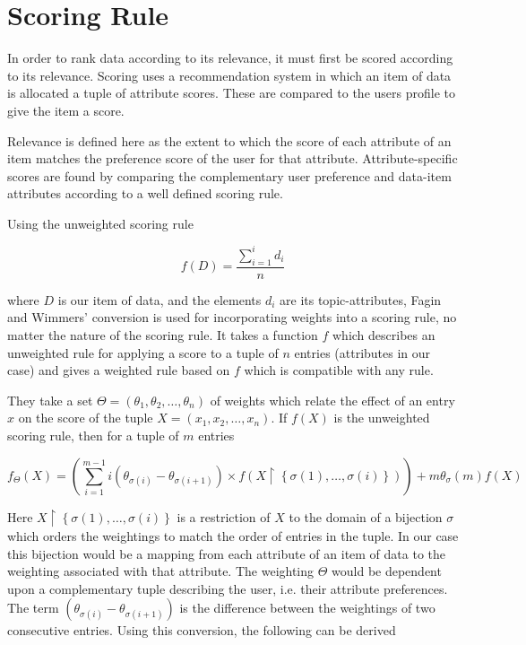 \section{Scoring Rule}

In order to rank data according to its relevance, it must first be scored according to its relevance. Scoring uses a recommendation system in which an item of data is allocated a tuple of attribute scores. These are compared to the users profile to give the item a score.

Relevance is defined here as the extent to which the score of each attribute of an item matches the preference score of the user for that attribute. Attribute-specific scores are found by comparing the complementary user preference and data-item attributes according to a well defined scoring rule. 

Using the unweighted scoring rule

\begin{equation}\label{AverageUnweightedRule}	
	f(D) = \frac{\sum_{i=1}^{i} d_i}{n}
\end{equation}

where $D$ is our item of data, and the elements $d_i$ are its topic-attributes, Fagin and Wimmers' \cite{FaginWimmers1} conversion is used for incorporating weights into a scoring rule, no matter the nature of the scoring rule. It takes a function $f$ which describes an unweighted rule for applying a score to a tuple of $n$ entries (attributes in our case) and gives a weighted rule based on $f$ which is compatible with any rule. 

They take a set $\Theta = (\theta_1,\theta_2,\dotsc,\theta_n)$ of weights which relate the effect of an entry $x$ on the score of the tuple $ X = (x_1, x_2, \dots, x_n)$. If $f(X)$ is the unweighted scoring rule, then for a tuple of $m$ entries

\begin{equation}\label{WeightedRule}	
	f_\Theta (X) = \left(\sum_{i=1}^{m-1} i(\theta_{\sigma{(i)}} - \theta_{\sigma{(i+1)}})\times f(X\upharpoonright\left\{\sigma(1),\dots,\sigma(i)\right\})\right) + m  \theta_\sigma{(m)}  f(X)
\end{equation}

Here $X\restriction\left\{\sigma(1),\dots,\sigma(i)\right\}$ is a restriction of $X$ to the domain of a bijection $\sigma$ which orders the weightings to match the order of entries in the tuple. In our case this bijection would be a mapping from each attribute of an item of data to the weighting associated with that attribute. The weighting $\Theta$ would be dependent upon a complementary tuple describing the user, i.e. their attribute preferences. The term $(\theta_{\sigma{(i)}} - \theta_{\sigma{(i+1)}})$ is the difference between the weightings of two consecutive entries. 
Using this conversion, the following can be derived


